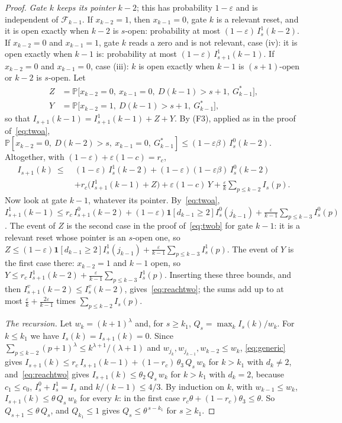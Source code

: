 \documentclass[11pt]{amsart}
\theoremstyle{definition}
\theoremstyle{remark}
\newcommand{\eps}{\varepsilon}
\newcommand{\PP}{\mathbb{P}}
\newcommand{\cF}{\mathcal{F}}
\begin{document}
\begin{proof}
\emph{Gate $k$ keeps its pointer} $k-2$; this has probability $1-\eps$ and is independent of
$\cF_{k-1}$. If $x_{k-2}=1$, then $x_{k-1}=0$, gate $k$ is a relevant reset, and it is open
exactly when $k-2$ is $s$-open: probability at most $(1-\eps)\,I^1_s(k-2)$. If $x_{k-2}=0$ and
$x_{k-1}=1$, gate $k$ reads a zero and is not relevant, case (iv): it is open exactly when $k-1$
is: probability at most $(1-\eps)\,I^1_{s+1}(k-1)$. If $x_{k-2}=0$ and $x_{k-1}=0$, case (iii): $k$ is open
exactly when $k-1$ is $(s+1)$-open or $k-2$ is $s$-open. Let
\begin{align*}
Z&=\PP\bigl[x_{k-2}=0,\ x_{k-1}=0,\ D(k-1)>s+1,\ G^*_{k-1}\bigr],\\
Y&=\PP\bigl[x_{k-2}=1,\ D(k-1)>s+1,\ G^*_{k-1}\bigr],
\end{align*}
so that $I_{s+1}(k-1)=I^1_{s+1}(k-1)+Z+Y$. By (F3), applied as in the proof of~\eqref{eq:twoa},
$\PP[x_{k-2}=0,\ D(k-2)>s,\ x_{k-1}=0,\ G^*_{k-1}]\le(1-\eps\beta)\,I^0_s(k-2)$. Altogether, with
$(1-\eps)+\eps(1-c)=r_c$,
\begin{align*}
I_{s+1}(k)\ \le\ {}&(1-\eps)\,I^1_s(k-2)+(1-\eps)(1-\eps\beta)\,I^0_s(k-2)\\
&+r_c\bigl(I^1_{s+1}(k-1)+Z\bigr)+\eps(1-c)\,Y+\frac\eps k\sum_{p\le k-2}I_s(p).
\end{align*}
Now look at gate $k-1$, whatever its pointer. By~\eqref{eq:twoa},
$I^1_{s+1}(k-1)\le r_c\,I^0_{s+1}(k-2)+(1-\eps)\mathbf 1[d_{k-1}\ge2]I^0_s(j_{k-1})
+\frac\eps{k-1}\sum_{p\le k-3}I^0_s(p)$. The event of $Z$ is the second case in the proof
of~\eqref{eq:twob} for gate $k-1$: it is a relevant reset whose pointer is an $s$-open one, so
$Z\le(1-\eps)\mathbf 1[d_{k-1}\ge2]I^1_s(j_{k-1})+\frac\eps{k-1}\sum_{p\le k-3}I^1_s(p)$. The event of
$Y$ is the first case there: $x_{k-2}=1$ and $k-1$ open, so
$Y\le r_c\,I^1_{s+1}(k-2)+\frac\eps{k-1}\sum_{p\le k-3}I^1_s(p)$. Inserting these three bounds,
and then $I^v_{s+1}(k-2)\le I^v_s(k-2)$, gives~\eqref{eq:reachtwo}; the sums add up to at most
$\frac\eps k+\frac{2\eps}{k-1}$ times $\sum_{p\le k-2}I_s(p)$.

\emph{The recursion.} Let $w_k=(k+1)^\lambda$ and, for $s\ge k_1$, $Q_s=\max_kI_s(k)/w_k$. For
$k\le k_1$ we have $I_s(k)=I_{s+1}(k)=0$. Since
$\sum_{p\le k-2}(p+1)^\lambda\le k^{\lambda+1}/(\lambda+1)$ and $w_{j_k},w_{j_{k-1}},w_{k-2}\le w_k$,
\eqref{eq:generic} gives $I_{s+1}(k)\le r_c\,I_{s+1}(k-1)+(1-r_c)\,\theta_3\,Q_s\,w_k$ for $k>k_1$
with $d_k\ne2$, and~\eqref{eq:reachtwo} gives $I_{s+1}(k)\le\theta_2\,Q_s\,w_k$ for $k>k_1$ with
$d_k=2$, because $c_1\le c_0$, $I^0_s+I^1_s=I_s$ and $k/(k-1)\le4/3$. By induction on $k$, with
$w_{k-1}\le w_k$, $I_{s+1}(k)\le\theta\,Q_s\,w_k$ for every $k$: in the first case
$r_c\theta+(1-r_c)\theta_3\le\theta$. So $Q_{s+1}\le\theta\,Q_s$, and $Q_{k_1}\le1$ gives
$Q_s\le\theta^{\,s-k_1}$ for $s\ge k_1$.


\end{proof}
\end{document}
